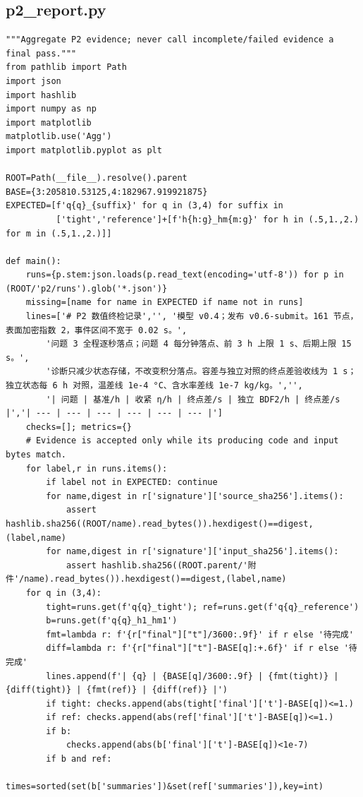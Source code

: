 \subsection{p2\_report.py}
\begin{verbatim}
"""Aggregate P2 evidence; never call incomplete/failed evidence a final pass."""
from pathlib import Path
import json
import hashlib
import numpy as np
import matplotlib
matplotlib.use('Agg')
import matplotlib.pyplot as plt

ROOT=Path(__file__).resolve().parent
BASE={3:205810.53125,4:182967.919921875}
EXPECTED=[f'q{q}_{suffix}' for q in (3,4) for suffix in
          ['tight','reference']+[f'h{h:g}_hm{m:g}' for h in (.5,1.,2.) for m in (.5,1.,2.)]]

def main():
    runs={p.stem:json.loads(p.read_text(encoding='utf-8')) for p in (ROOT/'p2/runs').glob('*.json')}
    missing=[name for name in EXPECTED if name not in runs]
    lines=['# P2 数值终检记录','', '模型 v0.4；发布 v0.6-submit。161 节点，表面加密指数 2，事件区间不宽于 0.02 s。',
        '问题 3 全程逐秒落点；问题 4 每分钟落点、前 3 h 上限 1 s、后期上限 15 s。',
        '诊断只减少状态存储，不改变积分落点。容差与独立对照的终点差验收线为 1 s；独立状态每 6 h 对照，温差线 1e-4 °C、含水率差线 1e-7 kg/kg。','',
        '| 问题 | 基准/h | 收紧 η/h | 终点差/s | 独立 BDF2/h | 终点差/s |','| --- | --- | --- | --- | --- | --- |']
    checks=[]; metrics={}
    # Evidence is accepted only while its producing code and input bytes match.
    for label,r in runs.items():
        if label not in EXPECTED: continue
        for name,digest in r['signature']['source_sha256'].items():
            assert hashlib.sha256((ROOT/name).read_bytes()).hexdigest()==digest,(label,name)
        for name,digest in r['signature']['input_sha256'].items():
            assert hashlib.sha256((ROOT.parent/'附件'/name).read_bytes()).hexdigest()==digest,(label,name)
    for q in (3,4):
        tight=runs.get(f'q{q}_tight'); ref=runs.get(f'q{q}_reference')
        b=runs.get(f'q{q}_h1_hm1')
        fmt=lambda r: f'{r["final"]["t"]/3600:.9f}' if r else '待完成'
        diff=lambda r: f'{r["final"]["t"]-BASE[q]:+.6f}' if r else '待完成'
        lines.append(f'| {q} | {BASE[q]/3600:.9f} | {fmt(tight)} | {diff(tight)} | {fmt(ref)} | {diff(ref)} |')
        if tight: checks.append(abs(tight['final']['t']-BASE[q])<=1.)
        if ref: checks.append(abs(ref['final']['t']-BASE[q])<=1.)
        if b:
            checks.append(abs(b['final']['t']-BASE[q])<1e-7)
        if b and ref:
            times=sorted(set(b['summaries'])&set(ref['summaries']),key=int)

\end{verbatim}
